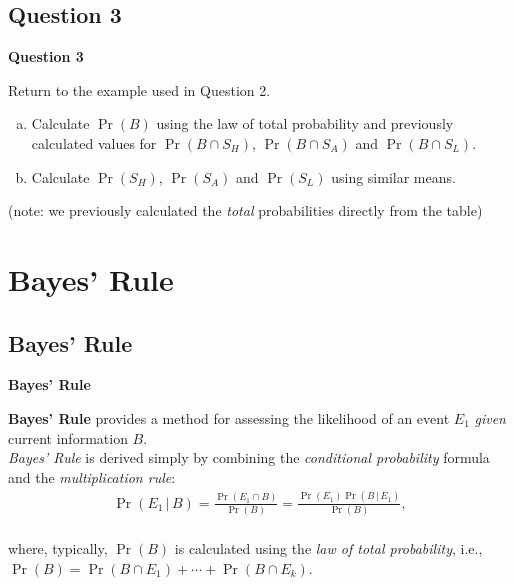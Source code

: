\documentclass[compress]{beamer}        %
\makeatletter
\newcommand{\tcb}{\textcolor{beamer@blendedblue}}
\makeatother
\begin{document}
\subsection{Question 3}
\begin{frame}{\bf \tcb{Question 3}}

Return to the example used in Question 2.\\[0.3cm]
\begin{enumerate}[a)]\itemsep0.6cm
\item Calculate $\Pr(B)$ using the law of total probability and previously calculated values for $\Pr(B \cap S_H)$, $\Pr(B\cap S_A)$ and $\Pr(B\cap S_L)$.
\item Calculate $\Pr(S_H)$, $\Pr(S_A)$ and $\Pr(S_L)$ using similar means.\\[1.5cm]
\end{enumerate}
{\footnotesize(note: we previously calculated the \emph{total} probabilities directly from the table)}

\end{frame}



\section{Bayes' Rule}
\subsection{Bayes' Rule}
\begin{frame}{\bf \tcb{Bayes' Rule}}

{\bf Bayes' Rule} provides a method for assessing the likelihood of an event $E_1$ \emph{given} current information $B$.\\[0.5cm]

\emph{Bayes' Rule} is derived simply by combining the \emph{conditional probability} formula and the \emph{multiplication rule}:\\[0.1cm]
\begin{align*}
\boxed{\Pr(E_1 \,|\, B) = \frac{\Pr(E_1 \cap B)}{\Pr(B)} = \frac{\Pr(E_1) \Pr(B \,|\, E_1)}{\Pr(B)}},\\[-0.1cm]
\end{align*}

where, typically, $\Pr(B)$ is calculated using the \emph{law of total probability}, i.e., $\Pr(B) = \Pr(B \cap E_1) + \cdots + \Pr(B \cap E_k)$.

\end{frame}
\end{document}
